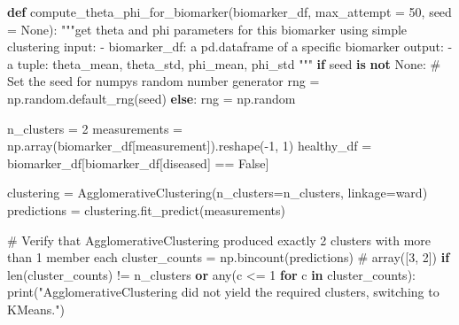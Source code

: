 \documentclass[
  letterpaper,
  DIV=11,
  numbers=noendperiod]{scrreprt}
\newenvironment{Shaded}{\begin{snugshade}}{\end{snugshade}}
\newcommand{\BuiltInTok}[1]{\textcolor[rgb]{0.00,0.23,0.31}{#1}}
\newcommand{\CommentTok}[1]{\textcolor[rgb]{0.37,0.37,0.37}{#1}}
\newcommand{\ControlFlowTok}[1]{\textcolor[rgb]{0.00,0.23,0.31}{\textbf{#1}}}
\newcommand{\DecValTok}[1]{\textcolor[rgb]{0.68,0.00,0.00}{#1}}
\newcommand{\KeywordTok}[1]{\textcolor[rgb]{0.00,0.23,0.31}{\textbf{#1}}}
\newcommand{\NormalTok}[1]{\textcolor[rgb]{0.00,0.23,0.31}{#1}}
\newcommand{\OperatorTok}[1]{\textcolor[rgb]{0.37,0.37,0.37}{#1}}
\newcommand{\StringTok}[1]{\textcolor[rgb]{0.13,0.47,0.30}{#1}}
\newcommand{\VariableTok}[1]{\textcolor[rgb]{0.07,0.07,0.07}{#1}}
\begin{document}
\begin{Shaded}
\begin{Highlighting}[]
\KeywordTok{def}\NormalTok{ compute\_theta\_phi\_for\_biomarker(biomarker\_df, max\_attempt }\OperatorTok{=} \DecValTok{50}\NormalTok{, seed }\OperatorTok{=} \VariableTok{None}\NormalTok{):}
    \CommentTok{"""get theta and phi parameters for this biomarker using simple clustering}
\CommentTok{    input: }
\CommentTok{        {-} biomarker\_df: a pd.dataframe of a specific biomarker}
\CommentTok{    output: }
\CommentTok{        {-} a tuple: theta\_mean, theta\_std, phi\_mean, phi\_std}
\CommentTok{    """}
    \ControlFlowTok{if}\NormalTok{ seed }\KeywordTok{is} \KeywordTok{not} \VariableTok{None}\NormalTok{:}
        \CommentTok{\# Set the seed for numpy\textquotesingle{}s random number generator}
\NormalTok{        rng }\OperatorTok{=}\NormalTok{ np.random.default\_rng(seed)}
    \ControlFlowTok{else}\NormalTok{:}
\NormalTok{        rng }\OperatorTok{=}\NormalTok{ np.random}

\NormalTok{    n\_clusters }\OperatorTok{=} \DecValTok{2}
\NormalTok{    measurements }\OperatorTok{=}\NormalTok{ np.array(biomarker\_df[}\StringTok{\textquotesingle{}measurement\textquotesingle{}}\NormalTok{]).reshape(}\OperatorTok{{-}}\DecValTok{1}\NormalTok{, }\DecValTok{1}\NormalTok{)}
\NormalTok{    healthy\_df }\OperatorTok{=}\NormalTok{ biomarker\_df[biomarker\_df[}\StringTok{\textquotesingle{}diseased\textquotesingle{}}\NormalTok{] }\OperatorTok{==} \VariableTok{False}\NormalTok{]}

\NormalTok{    clustering }\OperatorTok{=}\NormalTok{ AgglomerativeClustering(n\_clusters}\OperatorTok{=}\NormalTok{n\_clusters, linkage}\OperatorTok{=}\StringTok{\textquotesingle{}ward\textquotesingle{}}\NormalTok{)}
\NormalTok{    predictions }\OperatorTok{=}\NormalTok{ clustering.fit\_predict(measurements)}
    
    \CommentTok{\# Verify that AgglomerativeClustering produced exactly 2 clusters with more than 1 member each}
\NormalTok{    cluster\_counts }\OperatorTok{=}\NormalTok{ np.bincount(predictions) }\CommentTok{\# array([3, 2])}
    \ControlFlowTok{if} \BuiltInTok{len}\NormalTok{(cluster\_counts) }\OperatorTok{!=}\NormalTok{ n\_clusters }\KeywordTok{or} \BuiltInTok{any}\NormalTok{(c }\OperatorTok{\textless{}=} \DecValTok{1} \ControlFlowTok{for}\NormalTok{ c }\KeywordTok{in}\NormalTok{ cluster\_counts):}
        \BuiltInTok{print}\NormalTok{(}\StringTok{"AgglomerativeClustering did not yield the required clusters, switching to KMeans."}\NormalTok{)}
        

\end{Highlighting}
\end{Shaded}
\end{document}
